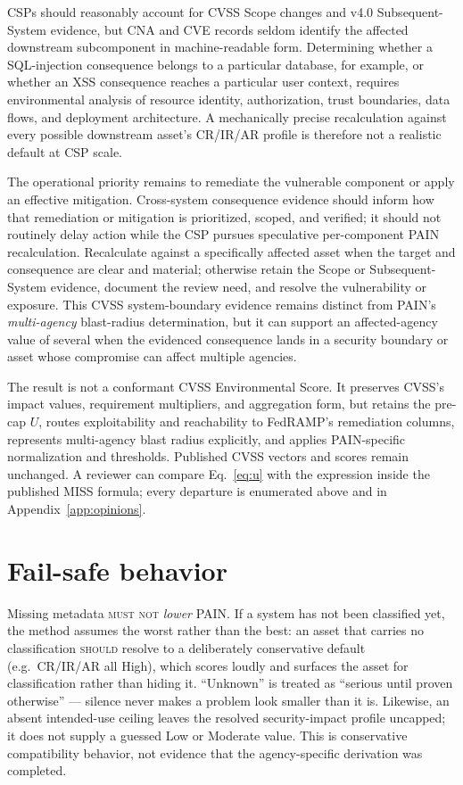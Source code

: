 \documentclass[11pt]{article}
\newcommand{\rfckw}[1]{\textsc{#1}}
\begin{document}
\begin{reality}
  CSPs should reasonably account for CVSS Scope changes and v4.0
  Subsequent-System evidence, but CNA and CVE records seldom identify the
  affected downstream subcomponent in machine-readable form. Determining whether
  a SQL-injection consequence belongs to a particular database, for example, or
  whether an XSS consequence reaches a particular user context, requires
  environmental analysis of resource identity, authorization, trust boundaries,
  data flows, and deployment architecture. A mechanically precise recalculation
  against every possible downstream asset's CR/IR/AR profile is therefore not a
  realistic default at CSP scale.

  The operational priority remains to remediate the vulnerable component or
  apply an effective mitigation. Cross-system consequence evidence should inform
  how that remediation or mitigation is prioritized, scoped, and verified; it
  should not routinely delay action while the CSP pursues speculative
  per-component PAIN recalculation. Recalculate against a specifically affected
  asset when the target and consequence are clear and material; otherwise retain
  the Scope or Subsequent-System evidence, document the review need, and resolve
  the vulnerability or exposure. This CVSS system-boundary evidence remains
  distinct from PAIN's \emph{multi-agency} blast-radius determination, but it can
  support an affected-agency value of several when the evidenced consequence lands
  in a security boundary or asset whose compromise can affect multiple agencies.
\end{reality}

The result is not a conformant CVSS Environmental Score. It preserves CVSS's
impact values, requirement multipliers, and aggregation form, but retains the
pre-cap $U$, routes exploitability and reachability to FedRAMP's remediation
columns, represents multi-agency blast radius explicitly, and applies PAIN-specific
normalization and thresholds. Published CVSS vectors and scores remain unchanged.
A reviewer can compare Eq.~\eqref{eq:u} with the expression inside the published
MISS formula; every departure is enumerated above and in
Appendix~\ref{app:opinions}.

\section{Fail-safe behavior}
Missing metadata \rfckw{must not} \emph{lower} PAIN. If a system has not been
classified yet, the method assumes the worst rather than the best: an asset that
carries no classification \rfckw{should} resolve to a deliberately conservative
default (e.g.\ CR/IR/AR all High), which scores loudly and surfaces the asset for
classification rather than hiding it. ``Unknown'' is treated as ``serious until
proven otherwise'' --- silence never makes a problem look smaller than it is.
Likewise, an absent intended-use ceiling leaves the resolved security-impact
profile uncapped;
it does not supply a guessed Low or Moderate value. This is conservative
compatibility behavior, not evidence that the agency-specific derivation was
completed.
\end{document}
